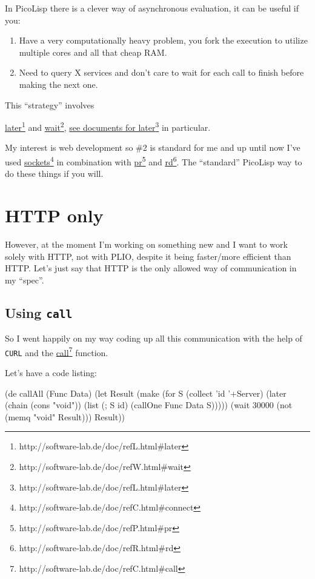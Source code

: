 In PicoLisp there is a clever way of asynchronous evaluation, it can
be useful if you:

\begin{enumerate}
\item Have a very computationally heavy problem, you fork the
  execution to utilize multiple cores and all that cheap RAM.
\item Need to query X services and don't care to wait for each call to
  finish before making the next one.
\end{enumerate}

This ``strategy'' involves

\underline{later}\footnote{http://software-lab.de/doc/refL.html\#later}
and
\underline{wait}\footnote{http://software-lab.de/doc/refW.html\#wait},
\underline{see documents for
  later}\footnote{http://software-lab.de/doc/refL.html\#later} in
particular.

My interest is web development so \#2 is standard for me and up until
now I've used
\underline{sockets}\footnote{http://software-lab.de/doc/refC.html\#connect}
in combination with
\underline{pr}\footnote{http://software-lab.de/doc/refP.html\#pr} and
\underline{rd}\footnote{http://software-lab.de/doc/refR.html\#rd}. The
``standard'' PicoLisp way to do these things if you will.

\section{HTTP only}
\label{sec:bla}

However, at the moment I'm working on something new and I want to work
solely with HTTP, not with PLIO, despite it being faster/more
efficient than HTTP. Let's just say that HTTP is the only allowed way
of communication in my ``spec''.

\subsection{Using \texttt{call}}
\label{sec:bla}

So I went happily on my way coding up all this communication with the
help of \texttt{CURL} and the
\underline{call}\footnote{http://software-lab.de/doc/refC.html\#call}
function.

Let's have a code listing:

\begin{wideverbatim}
(de callAll (Func Data)
   (let Result
      (make
         (for S (collect 'id '+Server)
            (later (chain (cons "void"))
               (list (; S id) (callOne Func Data S)))))
      (wait 30000 (not (memq "void" Result)))
      Result))
\end{wideverbatim}

